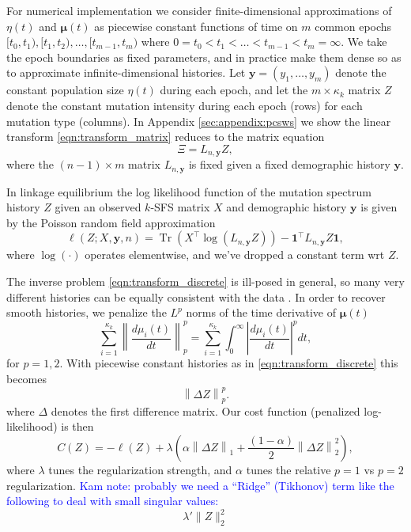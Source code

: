 \documentclass[11pt]{article}
\DeclareMathOperator{\Tr}{Tr}
\begin{document}
For numerical implementation we consider finite-dimensional approximations of $\eta(t)$ and $\boldsymbol\mu(t)$ as piecewise constant functions of time on $m$ common epochs $[t_0, t_1), [t_1, t_2),\dots, [t_{m-1}, t_m)$ where $0=t_0 < t_1 < \dots < t_{m-1} < t_m=\infty$.
We take the epoch boundaries as fixed parameters, and in practice make them dense so as to approximate infinite-dimensional histories.
Let $\boldsymbol y = (y_1,\dots,y_m)$ denote the constant population size $\eta(t)$ during each epoch, and let the $m\times\kappa_k$ matrix $Z$ denote the constant mutation intensity during each epoch (rows) for each mutation type (columns).
In Appendix \ref{sec:appendix:pcsws} we show the linear transform \eqref{eqn:transform_matrix} reduces to the matrix equation
\begin{equation}
\label{eqn:transform_discrete}
\Xi = L_{n, \boldsymbol y} Z,
\end{equation}
where the $(n-1)\times m$ matrix $L_{n, \boldsymbol y}$ is fixed given a fixed demographic history $\boldsymbol y$.

In linkage equilibrium the log likelihood function of the mutation spectrum history $Z$ given an observed $k$-SFS matrix $X$ and demographic history $\boldsymbol y$ is given by the Poisson random field approximation \citep{}
\[
\ell(Z; X, \boldsymbol y, n) = \Tr(X^\intercal\log(L_{n, \boldsymbol y} Z)) - \boldsymbol 1^\intercal L_{n, \boldsymbol y} Z\boldsymbol 1,
\]
where $\log(\cdot)$ operates elementwise, and we've dropped a constant term wrt $Z$.

The inverse problem \eqref{eqn:transform_discrete} is ill-posed in general, so many very different histories can be equally consistent with the data \citep{oscillation paper? Yun's other papers?}.
In order to recover smooth histories,
we penalize the $L^p$ norms
of the time derivative of $\boldsymbol\mu(t)$
\[
\sum_{i=1}^{\kappa_k}\left\| \frac{d \mu_i(t)}{d t} \right\|_p^p
= \sum_{i=1}^{\kappa_k}\int_0^\infty\left|\frac{d\mu_i(t)}{dt}\right|^p dt,
\]
for $p=1,2$.
With piecewise constant histories as in \eqref{eqn:transform_discrete} this becomes
\[
\left\|\Delta Z \right\|_p^p.
\]
where $\Delta$ denotes the first difference matrix.
Our cost function (penalized log-likelihood) is then
\begin{equation}
\label{eqn:penalized}
C(Z)
= -\ell(Z) + \lambda \left(\alpha\left\|\Delta Z\right\|_1 + \frac{(1-\alpha)}{2}\left\|\Delta Z\right\|_2^2\right),
\end{equation}
where $\lambda$ tunes the regularization strength, and $\alpha$ tunes the relative $p=1$ vs $p=2$ regularization.
\textcolor{blue}{Kam note: probably we need a ``Ridge'' (Tikhonov)
term like the following to deal with small singular values:}
\[
\lambda' \| Z \|_2^2
\]
\end{document}
